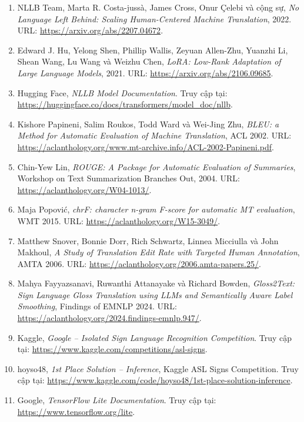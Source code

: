 \begin{enumerate}
    \item NLLB Team, Marta R. Costa-juss\`{a}, James Cross, Onur \c{C}elebi và cộng sự, \textit{No Language Left Behind: Scaling Human-Centered Machine Translation}, 2022. URL:
    \url{https://arxiv.org/abs/2207.04672}.

    \item Edward J. Hu, Yelong Shen, Phillip Wallis, Zeyuan Allen-Zhu, Yuanzhi Li, Shean Wang, Lu Wang và Weizhu Chen, \textit{LoRA: Low-Rank Adaptation of Large Language Models}, 2021. URL:
    \url{https://arxiv.org/abs/2106.09685}.

    \item Hugging Face, \textit{NLLB Model Documentation}. Truy cập tại:
    \url{https://huggingface.co/docs/transformers/model_doc/nllb}.

    \item Kishore Papineni, Salim Roukos, Todd Ward và Wei-Jing Zhu, \textit{BLEU: a Method for Automatic Evaluation of Machine Translation}, ACL 2002. URL:
    \url{https://aclanthology.org/www.mt-archive.info/ACL-2002-Papineni.pdf}.

    \item Chin-Yew Lin, \textit{ROUGE: A Package for Automatic Evaluation of Summaries}, Workshop on Text Summarization Branches Out, 2004. URL:
    \url{https://aclanthology.org/W04-1013/}.

    \item Maja Popovi\'{c}, \textit{chrF: character n-gram F-score for automatic MT evaluation}, WMT 2015. URL:
    \url{https://aclanthology.org/W15-3049/}.

    \item Matthew Snover, Bonnie Dorr, Rich Schwartz, Linnea Micciulla và John Makhoul, \textit{A Study of Translation Edit Rate with Targeted Human Annotation}, AMTA 2006. URL:
    \url{https://aclanthology.org/2006.amta-papers.25/}.

    \item Mahya Fayyazsanavi, Ruwanthi Attanayake và Richard Bowden, \textit{Gloss2Text: Sign Language Gloss Translation using LLMs and Semantically Aware Label Smoothing}, Findings of EMNLP 2024. URL:
    \url{https://aclanthology.org/2024.findings-emnlp.947/}.

    \item Kaggle, \textit{Google -- Isolated Sign Language Recognition Competition}. Truy cập tại:
    \url{https://www.kaggle.com/competitions/asl-signs}.

    \item hoyso48, \textit{1st Place Solution -- Inference}, Kaggle ASL Signs Competition. Truy cập tại:
    \url{https://www.kaggle.com/code/hoyso48/1st-place-solution-inference}.

    \item Google, \textit{TensorFlow Lite Documentation}. Truy cập tại:
    \url{https://www.tensorflow.org/lite}.
\end{enumerate}
\endgroup

